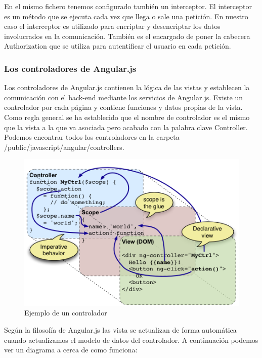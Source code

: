 En el mismo fichero tenemos configurado también un interceptor. El interceptor es un método que se ejecuta cada vez que llega o sale una petición. En nuestro caso el interceptor es utilizado para encriptar y desencriptar los datos involucrados en la comunicación. También es el encargado de poner la cabecera Authorization que se utiliza para autentificar el usuario en cada petición.

\subsubsection{Los controladores de Angular.js}

Los controladores de Angular.js contienen la lógica de las vistas y establecen la comunicación con el back-end mediante los servicios de Angular.js. Existe un controlador por cada página y contiene funciones y datos propias de la vista. Como regla general se ha establecido que el nombre de controlador es el mismo que la vista a la que va asociada pero acabado con la palabra clave Controller. Podemos encontrar todos los controladores en la carpeta /public/javascript/angular/controllers.  

\begin{figure}[H]
	\centering\includegraphics[scale=0.5]{imagenes/concepts-controller.png}
	\caption{Ejemplo de un controlador}
	\label{controllerExample}
\end{figure}

Según la filosofía de Angular.js las vista se actualizan de forma automática cuando actualizamos el modelo de datos del controlador. A continuación podemos ver un diagrama a cerca de como funciona:

